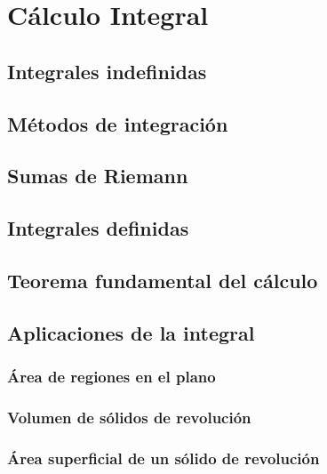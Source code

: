 \section{Cálculo Integral}

\subsection{Integrales indefinidas}

\subsection{Métodos de integración}

\subsection{Sumas de Riemann}

\subsection{Integrales definidas}

\subsection{Teorema fundamental del cálculo}


\subsection{Aplicaciones de la integral}

\subsubsection{Área de regiones en el plano}

\subsubsection{Volumen de sólidos de revolución}

\subsubsection{Área superficial de un sólido de revolución}